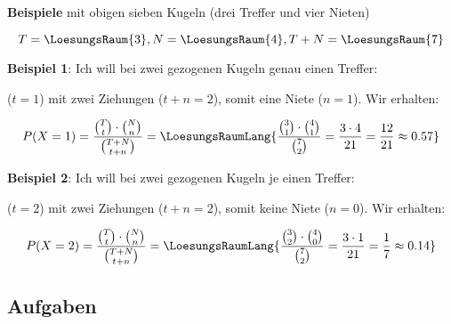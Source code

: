 \textbf{Beispiele} mit obigen sieben Kugeln (drei Treffer und vier
Nieten)
\leserluft

$$T=\LoesungsRaum{3}, N=\LoesungsRaum{4}, T+N=\LoesungsRaum{7}$$


\textbf{Beispiel 1}: Ich will bei zwei gezogenen Kugeln genau einen Treffer:

($t=1$) mit zwei Ziehungen ($t+n=2$), somit eine Niete ($n=1$).
Wir erhalten:

$$P(X=1) = \frac{ {T\choose t} \cdot{} {{N}\choose {n}}}{{{T+N}
    \choose {t+n}}} = \LoesungsRaumLang{\frac{ {3\choose 1} \cdot{} {{4}\choose {1}}}{{7
    \choose 2}} = \frac{3\cdot{4}}{21} = \frac{12}{21} \approx 0.57}$$

\textbf{Beispiel 2}: Ich will bei zwei gezogenen Kugeln je einen Treffer:

($t=2$) mit zwei Ziehungen ($t+n=2$), somit keine Niete ($n=0$).
Wir erhalten:

$$P(X=2) = \frac{ {T\choose t} \cdot{} {{N}\choose {n}}}{{{T+N}
    \choose {t+n}}} = \LoesungsRaumLang{\frac{ {3\choose 2} \cdot{} {{4}\choose {0}}}{{7
    \choose 2}} = \frac{3\cdot{}1}{21} = \frac17 \approx 0.14}$$

\newpage

\subsection*{Aufgaben}

\newpage

